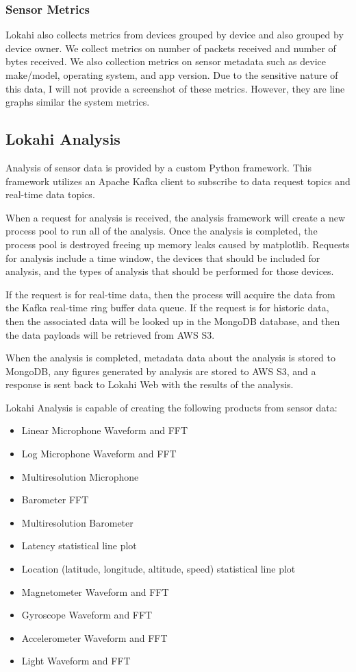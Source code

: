 \subsubsection{Sensor Metrics}

Lokahi also collects metrics from devices grouped by device and also grouped by device owner. We collect metrics on number of packets received and number of bytes received. We also collection metrics on sensor metadata such as device make/model, operating system, and app version. Due to the sensitive nature of this data, I will not provide a screenshot of these metrics. However, they are line graphs similar the system metrics.

\subsection{Lokahi Analysis}\label{subsec:lokahi-analysis}
Analysis of sensor data is provided by a custom Python framework. This framework utilizes an Apache Kafka client to subscribe to data request topics and real-time data topics.

When a request for analysis is received, the analysis framework will create a new process pool to run all of the analysis. Once the analysis is completed, the process pool is destroyed freeing up memory leaks caused by matplotlib. Requests for analysis include a time window, the devices that should be included for analysis, and the types of analysis that should be performed for those devices.

If the request is for real-time data, then the process will acquire the data from the Kafka real-time ring buffer data queue. If the request is for historic data, then the associated data will be looked up in the MongoDB database, and then the data payloads will be retrieved from AWS S3.

When the analysis is completed, metadata data about the analysis is stored to MongoDB, any figures generated by analysis are stored to AWS S3, and a response is sent back to Lokahi Web with the results of the analysis.

Lokahi Analysis is capable of creating the following products from sensor data:

\begin{itemize}
	\item Linear Microphone Waveform and FFT
	\item Log Microphone Waveform and FFT
	\item Multiresolution Microphone
	\item Barometer FFT
	\item Multiresolution Barometer
	\item Latency statistical line plot
	\item Location (latitude, longitude, altitude, speed) statistical line plot
	\item Magnetometer Waveform and FFT
	\item Gyroscope Waveform and FFT
	\item Accelerometer Waveform and FFT
	\item Light Waveform and FFT
\end{itemize}

